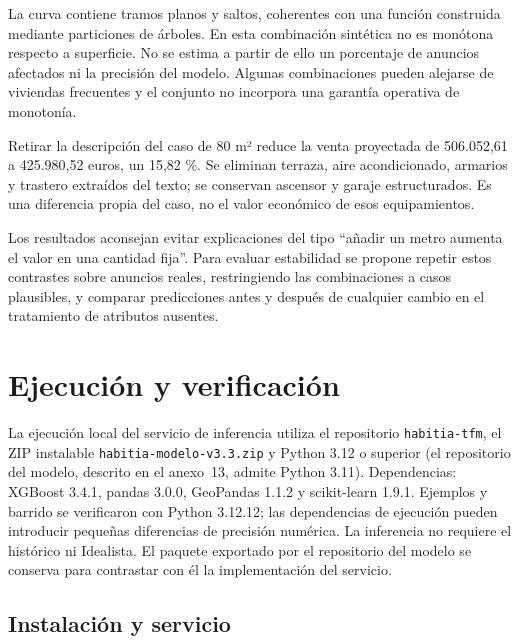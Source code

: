 \documentclass[11pt,a4paper]{article}
\newcounter{anexo}
\newcounter{anexosub}[anexo]
\begin{document}
La curva contiene tramos planos y saltos, coherentes con una función construida mediante particiones de árboles. En esta combinación sintética no es monótona respecto a superficie. No se estima a partir de ello un porcentaje de anuncios afectados ni la precisión del modelo. Algunas combinaciones pueden alejarse de viviendas frecuentes y el conjunto no incorpora una garantía operativa de monotonía.

Retirar la descripción del caso de 80 m² reduce la venta proyectada de 506.052,61 a 425.980,52 euros, un 15,82 \%. Se eliminan terraza, aire acondicionado, armarios y trastero extraídos del texto; se conservan ascensor y garaje estructurados. Es una diferencia propia del caso, no el valor económico de esos equipamientos.

Los resultados aconsejan evitar explicaciones del tipo ``añadir un metro aumenta el valor en una cantidad fija''. Para evaluar estabilidad se propone repetir estos contrastes sobre anuncios reales, restringiendo las combinaciones a casos plausibles, y comparar predicciones antes y después de cualquier cambio en el tratamiento de atributos ausentes.

\clearpage{}\label{anx:\theanexo}%
\section*{\theanexo\hspace{0.6em}Ejecución y verificación}

La ejecución local del servicio de inferencia utiliza el repositorio \texttt{habitia-tfm}, el ZIP instalable \texttt{habitia-modelo-v3.3.zip} y Python 3.12 o superior (el repositorio del modelo, descrito en el anexo~13, admite Python 3.11). Dependencias: XGBoost 3.4.1, pandas 3.0.0, GeoPandas 1.1.2 y scikit-learn 1.9.1. Ejemplos y barrido se verificaron con Python 3.12.12; las dependencias de ejecución pueden introducir pequeñas diferencias de precisión numérica. La inferencia no requiere el histórico ni Idealista. El paquete exportado por el repositorio del modelo se conserva para contrastar con él la implementación del servicio.

%
\subsection*{\theanexo\hspace{0.3em}\hspace{0.45em}Instalación y servicio}
\end{document}
